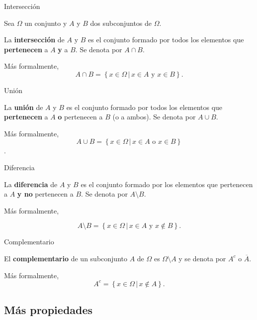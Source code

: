 \documentclass[
  letterpaper,
  DIV=11,
  numbers=noendperiod]{scrreprt}
\begin{document}
\begin{Definicion}{Intersección}{}

Sea \(\Omega\) un conjunto y \(A\) y \(B\) dos subconjuntos de
\(\Omega\).

La \textbf{intersección} de \(A\) y \(B\) es el conjunto formado por
todos los elementos que \textbf{pertenecen} a \(A\) \textbf{y} a \(B\).
Se denota por \(A\cap B\).

Más formalmente, \[
A\cap B=\left\{x\in\Omega \,\big|\, x\in A \text{ y } x\in B\right\}.
\]

\end{Definicion}

\begin{Definicion}{Unión}{}

La \textbf{unión} de \(A\) y \(B\) es el conjunto formado por todos los
elementos que \textbf{pertenecen} a \(A\) \textbf{o} pertenecen a \(B\)
(o a ambos). Se denota por \(A\cup B\).

Más formalmente, \[
A\cup B=\left\{x\in\Omega \,\big|\, x\in A \text{ o } x\in B\right\}
\].

\end{Definicion}

\begin{Definicion}{Diferencia}{}

La \textbf{diferencia} de \(A\) y \(B\) es el conjunto formado por los
elementos que pertenecen a \(A\) \textbf{y no} pertenecen a \(B\). Se
denota por \(A\setminus B\).

Más formalmente,

\[
A\setminus B=\left\{x\in\Omega \,\big|\, x\in A \text{ y } x\notin B\right\}.
\]

\end{Definicion}

\begin{Definicion}{Complementario}{}

El \textbf{complementario} de un subconjunto \(A\) de \(\Omega\) es
\(\Omega\setminus A\) y se denota por \(A^c\) o \(\overline{A}\).

Más formalmente, \[
A^c=\left\{x\in\Omega \,\big|\, x\not\in A\right\}.
\]

\end{Definicion}

\subsection{Más propiedades}\label{muxe1s-propiedades}
\end{document}
